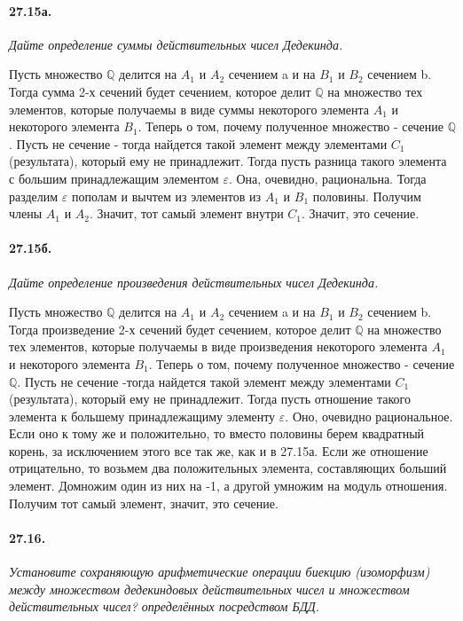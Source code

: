 \documentclass{book}
\begin{document}
\paragraph{27.15а.}
\textit{Дайте определение суммы действительных чисел Дедекинда.}

Пусть множество $\mathbb{Q}$ делится на $A_1$ и $A_2$ сечением a и на $B_1$ и $B_2$ сечением b. Тогда сумма 2-х сечений будет сечением, которое делит $\mathbb{Q}$ на множество тех элементов, которые получаемы в виде суммы некоторого элемента $A_1$ и некоторого элемента $B_1$. Теперь о том, почему полученное множество - сечение $\mathbb{Q}$. Пусть не сечение - тогда найдется такой элемент между элементами $C_1$ (результата), который ему не принадлежит. Тогда пусть разница такого элемента с большим принадлежащим элементом $\varepsilon$. Она, очевидно, рациональна. Тогда разделим $\varepsilon$ пополам и вычтем из элементов из $A_1$ и $B_1$ половины. Получим члены $A_1$ и $A_2$. Значит, тот самый элемент внутри $C_1$. Значит, это сечение.

\paragraph{27.15б.}
\textit{Дайте определение произведения действительных чисел Дедекинда.}

Пусть множество $\mathbb{Q}$ делится на $A_1$ и $A_2$ сечением a и на $B_1$ и $B_2$ сечением b. Тогда произведение 2-х сечений будет сечением, которое делит $\mathbb{Q}$ на множество тех элементов, которые получаемы в виде произведения некоторого элемента $A_1$ и некоторого элемента $B_1$. Теперь о том, почему полученное множество - сечение $\mathbb{Q}$. Пусть не сечение -тогда найдется такой элемент между элементами $C_1$ (результата), который ему не принадлежит. Тогда пусть отношение такого элемента к большему принадлежащиму элементу $\varepsilon$. Оно, очевидно рациональное. Если оно к тому же и положительно, то вместо половины берем квадратный корень, за исключением этого все так же, как и в 27.15а. Если же отношение отрицательно, то возьмем два положительных элемента, составляющих больший элемент. Домножим один из них на -1, а другой умножим на модуль отношения. Получим тот самый элемент, значит, это сечение.

\paragraph{27.16.}
\textit{Установите сохраняющую арифметические операции биекцию (изоморфизм) между множеством дедекиндовых действительных чисел и множеством действительных чисел? определённых посредством БДД.}
\end{document}
